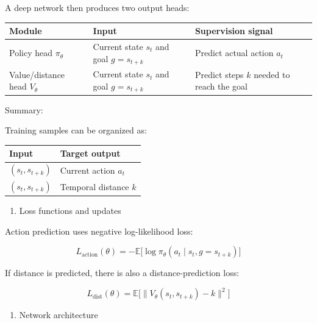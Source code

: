 A deep network then produces two output heads:

\begin{longtable}[]{@{}
  >{\raggedright\arraybackslash}p{}
  >{\raggedright\arraybackslash}p{}
  >{\raggedright\arraybackslash}p{}@{}}
\toprule
Module & Input & Supervision signal \\
\midrule
\endhead
Policy head \(\pi_\theta\) & Current state \(s_t\) and goal \(g=s_{t+k}\) & Predict actual action \(a_t\) \\
Value/distance head \(V_\theta\) & Current state \(s_t\) and goal \(g=s_{t+k}\) & Predict steps \(k\) needed to reach the goal \\
\bottomrule
\end{longtable}

Summary:

Training samples can be organized as:

\begin{longtable}[]{@{}
  >{\raggedright\arraybackslash}p{}
  >{\raggedright\arraybackslash}p{}@{}}
\toprule
Input & Target output \\
\midrule
\endhead
\((s_t,s_{t+k})\) & Current action \(a_t\) \\
\((s_t,s_{t+k})\) & Temporal distance \(k\) \\
\bottomrule
\end{longtable}

\begin{enumerate}
\def\labelenumi{\arabic{enumi}.}
\setcounter{enumi}{1}
\tightlist
\item
  Loss functions and updates
\end{enumerate}

Action prediction uses negative log-likelihood loss:

\[
L_{\mathrm{action}}(\theta)
=
-
\mathbb{E}
\bigl[
\log \pi_\theta(a_t\mid s_t,g=s_{t+k})
\bigr]
\]

If distance is predicted, there is also a distance-prediction loss:

\[
L_{\mathrm{dist}}(\theta)
=
\mathbb{E}
\bigl[
\lVert
V_\theta(s_t,s_{t+k})-k
\rVert^{2}
\bigr]
\]

\begin{enumerate}
\def\labelenumi{\arabic{enumi}.}
\setcounter{enumi}{2}
\tightlist
\item
  Network architecture
\end{enumerate}

